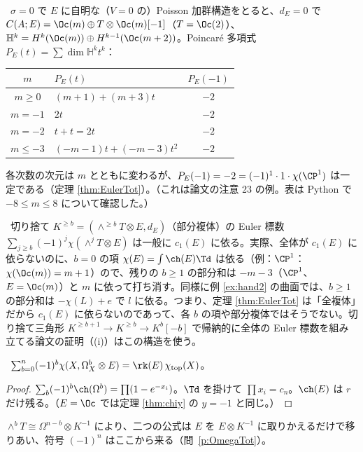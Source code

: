 \begin{ex}[$\CP^1$、$\sigma=0$、$E=\Oc(m)$：次元は跳び、Euler 標数は跳ばない]\label{ex:P1jump}\tP\
$\sigma=0$ で $E$ に自明な（$V=0$ の）Poisson 加群構造をとると、$d_E=0$ で $C(A;E)=\Oc(m)\oplus T\otimes\Oc(m)[-1]$（$T=\Oc(2)$）、$\mathbb H^k=H^k(\Oc(m))\oplus H^{k-1}(\Oc(m+2))$。Poincaré 多項式 $P_E(t)=\sum\dim\mathbb H^kt^k$：
\begin{center}
\begin{tabular}{c|l|c}
\toprule
$m$ & $P_E(t)$ & $P_E(-1)$\\
\midrule
$m\ge0$ & $(m+1)+(m+3)t$ & $-2$\\
$m=-1$ & $2t$ & $-2$\\
$m=-2$ & $t+t=2t$ & $-2$\\
$m\le-3$ & $(-m-1)t+(-m-3)t^2$ & $-2$\\
\bottomrule
\end{tabular}
\end{center}
各次数の次元は $m$ とともに変わるが、$P_E(-1)=-2=(-1)^1\cdot1\cdot\chi(\CP^1)$ は一定である（定理 \ref{thm:EulerTot}）。（これは論文の注意 23 の例。表は Python で $-8\le m\le8$ について確認した。）
\end{ex}

\begin{rem}[部分和は $c_1(E)$ を見る]\label{rem:partial}\tP\
切り捨て $K^{\ge b}=(\wedge^{\ge b}T\otimes E,d_E)$（部分複体）の Euler 標数 $\sum_{j\ge b}(-1)^j\chi(\wedge^jT\otimes E)$ は一般に $c_1(E)$ に依る。実際、全体が $c_1(E)$ に依らないのに、$b=0$ の項 $\chi(E)=\int\ch(E)\Td$ は依る（例：$\CP^1$：$\chi(\Oc(m))=m+1$）ので、残りの $b\ge1$ の部分和は $-m-3$（$\CP^1$、$E=\Oc(m)$）と $m$ に依って打ち消す。同様に例 \ref{ex:hand2} の曲面では、$b\ge1$ の部分和は $-\chi(L)+e$ で $l$ に依る。つまり、定理 \ref{thm:EulerTot} は「全複体」だから $c_1(E)$ に依らないのであって、各 $b$ の項や部分複体ではそうでない。切り捨て三角形 $K^{\ge b+1}\to K^{\ge b}\to K^b[-b]$ で帰納的に全体の Euler 標数を組み立てる論文の証明（(i)）はこの構造を使う。
\end{rem}
\begin{prop}[双対版：$\Omega^b$ の交代和]\label{prop:OmegaTot}\tP\
$\sum_{b=0}^n(-1)^b\chi(X,\Omega^b_X\otimes E)=\rk(E)\,\chi_{\rm top}(X)$。
\end{prop}
\begin{proof}
$\sum_b(-1)^b\ch(\Omega^b)=\prod(1-e^{-x_i})$。$\Td$ を掛けて $\prod x_i=c_n$。$\ch(E)$ は $r$ だけ残る。（$E=\Oc$ では定理 \ref{thm:chiy} の $y=-1$ と同じ。）
\end{proof}
\noindent $\wedge^bT\cong\Omega^{n-b}\otimes K^{-1}$ により、二つの公式は $E$ を $E\otimes K^{-1}$ に取りかえるだけで移りあい、符号 $(-1)^n$ はここから来る（問~\ref{p:OmegaTot}）。

